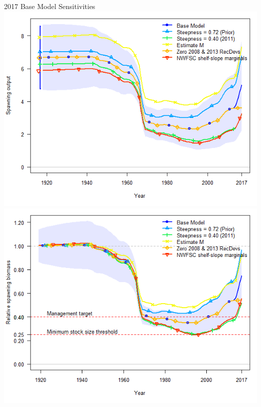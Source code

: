 \documentclass[pdf]{beamer}\usepackage[]{graphicx}\usepackage[]{color}
\begin{document}
\begin{frame}{2017 Base Model Sensitivities}
    \includegraphics[scale = 0.28]{figures/SSB_sensitivities_1.png}
    \includegraphics[scale = 0.28]{figures/Bratio_sensitivites_1.png}
\end{frame}

\end{document}
